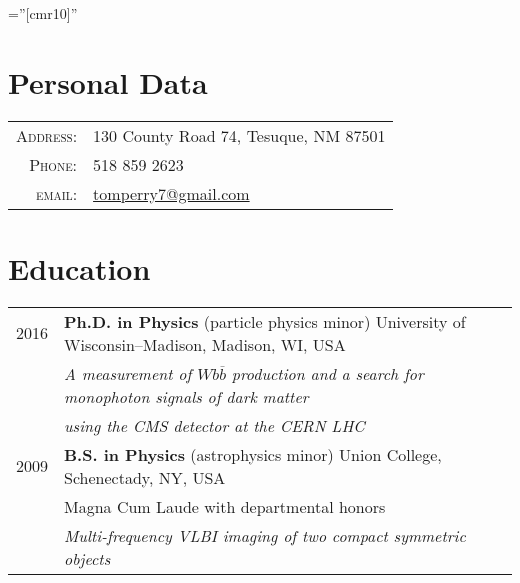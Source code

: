 \documentclass[10pt]{article} %
\begin{document}
\pagestyle{fancy}
\thispagestyle{empty}

\font\fb=''[cmr10]'' %


\par{\bigskip\par} %

\section{Personal Data}

\begin{tabular}{rl}
\textsc{Address:} & 130 County Road 74, Tesuque, NM 87501 \\
\textsc{Phone:} & 518 859 2623 \\
\textsc{email:} & \href{mailto:tomperry7@gmail.com}{tomperry7@gmail.com} \\
\end{tabular}


\section{Education}

\begin{tabular}{rl}	
2016 & {\bf Ph.D. in Physics} (particle physics minor) University of Wisconsin--Madison, Madison, WI, USA \\
 {}  & \emph{A measurement of $Wb\overline{b}$ production and a search for monophoton signals of dark matter}\\
 {}  & \emph{ using the CMS detector at the CERN LHC} \\

2009 & {\bf B.S. in Physics} (astrophysics minor) Union College, Schenectady, NY, USA \\
 {}  & Magna Cum Laude with departmental honors \\
 {}  & \emph{Multi-frequency VLBI imaging of two compact symmetric objects} \\
\end{tabular}
\end{document}
